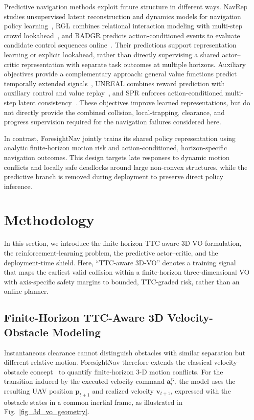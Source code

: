 \documentclass[letterpaper, 10 pt, conference]{ieeeconf}
\begin{document}
Predictive navigation methods exploit future structure in different ways. NavRep studies unsupervised latent reconstruction and dynamics models for navigation policy learning~\cite{navrep}, RGL combines relational interaction modeling with multi-step crowd lookahead~\cite{rgl}, and BADGR predicts action-conditioned events to evaluate candidate control sequences online~\cite{badgr}. Their predictions support representation learning or explicit lookahead, rather than directly supervising a shared actor--critic representation with separate task outcomes at multiple horizons. Auxiliary objectives provide a complementary approach: general value functions predict temporally extended signals~\cite{sutton2011horde}, UNREAL combines reward prediction with auxiliary control and value replay~\cite{jaderberg2017unreal}, and SPR enforces action-conditioned multi-step latent consistency~\cite{schwarzer2021spr}. These objectives improve learned representations, but do not directly provide the combined collision, local-trapping, clearance, and progress supervision required for the navigation failures considered here.

In contrast, ForesightNav jointly trains its shared policy representation using analytic finite-horizon motion risk and action-conditioned, horizon-specific navigation outcomes. This design targets late responses to dynamic motion conflicts and locally safe deadlocks around large non-convex structures, while the predictive branch is removed during deployment to preserve direct policy inference.


\section{Methodology}\label{sec:methodology}
In this section, we introduce the finite-horizon TTC-aware 3D-VO formulation, the reinforcement-learning problem, the predictive actor--critic, and the deployment-time shield. Here, ``TTC-aware 3D-VO'' denotes a training signal that maps the earliest valid collision within a finite-horizon three-dimensional VO with axis-specific safety margins to bounded, TTC-graded risk, rather than an online planner.

\subsection{Finite-Horizon TTC-Aware 3D Velocity-Obstacle Modeling}\label{subsec:vo}
Instantaneous clearance cannot distinguish obstacles with similar separation but different relative motion. ForesightNav therefore extends the classical velocity-obstacle concept~\cite{fiorini1998vo} to quantify finite-horizon 3-D motion conflicts. For the transition induced by the executed velocity command \(\mathbf{a}_t^G\), the model uses the resulting UAV position \(\mathbf{p}_{t+1}\) and realized velocity \(\mathbf{v}_{t+1}\), expressed with the obstacle states in a common inertial frame, as illustrated in Fig.~\ref{fig_3d_vo_geometry}.
\end{document}
